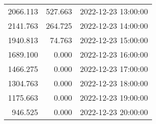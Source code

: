 \documentclass[
]{article}
\begin{document}
\begin{longtable}[]{@{}rrl@{}}
2066.113 & 527.663 & 2022-12-23 13:00:00 \\
2141.763 & 264.725 & 2022-12-23 14:00:00 \\
1940.813 & 74.763 & 2022-12-23 15:00:00 \\
1689.100 & 0.000 & 2022-12-23 16:00:00 \\
1466.275 & 0.000 & 2022-12-23 17:00:00 \\
1304.763 & 0.000 & 2022-12-23 18:00:00 \\
1175.663 & 0.000 & 2022-12-23 19:00:00 \\
946.525 & 0.000 & 2022-12-23 20:00:00 \\
\bottomrule()
\end{longtable}
\end{document}
